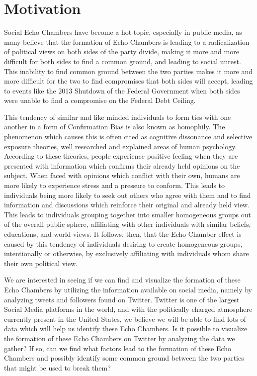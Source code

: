 \documentclass[journal]{IEEEtran}
\begin{document}
	\section{Motivation}
	
	Social Echo Chambers have become a hot topic, especially in public media, as many believe that the formation of Echo Chambers is leading to a radicalization of political views on both sides of the party divide, making it more and more difficult for both sides to find a common ground, and leading to social unrest. This inability to find common ground between the two parties makes it more and more difficult for the two to find compromises that both sides will accept, leading to events like the 2013 Shutdown of the Federal Government when both sides were unable to find a compromise on the Federal Debt Ceiling. 
	
	This tendency of similar and like minded individuals to form ties with one another in a form of Confirmation Bias is also known as homophily. The phenomenon which causes this is often cited as cognitive dissonance and selective exposure theories, well researched and explained areas of human psychology. According to these theories, people experience positive feeling when they are presented with information which confirms their already held opinions on the subject. When faced with opinions which conflict with their own, humans are more likely to experience stress and a pressure to conform. This leads to individuals being more likely to seek out others who agree with them and to find information and discussions which reinforce their original and already held view. This leads to individuals grouping together into smaller homogeneous groups out of the overall public sphere, affiliating with other individuals with similar beliefs, educations, and world views. It follows, then, that the Echo Chamber effect is caused by this tendency of individuals desiring to create homogeneous groups, intentionally or otherwise, by exclusively affiliating with individuals whom share their own political view. 
	
	We are interested in seeing if we can find and visualize the formation of these Echo Chambers by utilizing the information available on social media, namely by analyzing tweets and followers found on Twitter. Twitter is one of the largest Social Media platforms in the world, and with the politically charged atmosphere currently present in the United States, we believe we will be able to find lots of data which will help us identify these Echo Chambers. Is it possible to visualize the formation of these Echo Chambers on Twitter by analyzing the data we gather? If so, can we find what factors lead to the formation of these Echo Chambers and possibly identify some common ground between the two parties that might be used to break them? 
	
\end{document}
